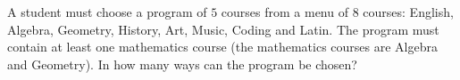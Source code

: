 A student must choose a program of $5$ courses from a menu of $8$ courses: English, Algebra, Geometry, History, Art, Music, Coding and Latin. The program must contain at least one mathematics course (the mathematics courses are Algebra and Geometry). In how many ways can the program be chosen?
